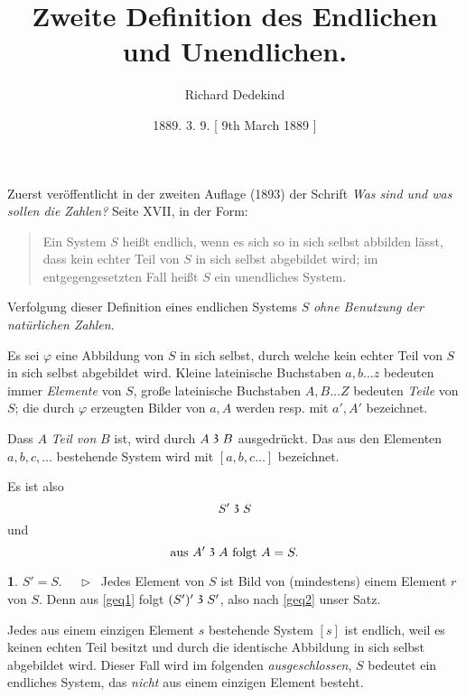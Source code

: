 \documentclass[leqno,hidelinks]{article}
\theoremstyle{definition}
\newtheorem{satz}{\protect\satzname}
\newcommand{\satzname}{}
\renewcommand{\satzname}{\hspace{-4pt}.\ Satz}%
\renewcommand{\satzname}{\hspace{-4pt}.\ Theorem}%
\newcommand\Beweis{\medskip \newline $ \phantom{'.'} \rhd \ $}%
\newcommand\TeilVon{\mathrel{\raisebox{0.45ex}{$\mathfrak{3}$}}}
\begin{document}
\hypersetup{pageanchor=false}

\title{Zweite Definition des Endlichen und Unendlichen.}
\author{Richard Dedekind}
\date{1889. 3. 9. \phantom{} [ 9th March 1889 ]}
\maketitle

\thispagestyle{empty}

\begin{paracol}{2} %


\noindent Zuerst veröffentlicht in der zweiten Auflage (1893) der Schrift
\textit{\glqq Was sind und was sollen die Zahlen?\grqq{}} Seite XVII, in der Form:%

\begin{quote}
Ein System $S$ heißt endlich, wenn es sich so in sich selbst abbilden
lässt, dass kein echter Teil von $S$ in sich selbst abgebildet
wird; im entgegengesetzten Fall heißt $S$ ein unendliches System.
\end{quote}

Verfolgung dieser Definition eines endlichen Systems $S$
\emph{ohne Benutzung der natürlichen Zahlen}.

Es sei $\varphi$ eine Abbildung von $S$ in sich selbst, durch welche kein echter
Teil von $S$ in sich selbst abgebildet wird.
Kleine lateinische Buchstaben  $a, b \ldots z$ bedeuten immer \emph{Elemente} von
$S$, große lateinische Buchstaben $A, B \ldots Z$ bedeuten \emph{Teile} von $S$;
die durch $\varphi$ erzeugten Bilder von $a, A$ werden resp. mit $a', A'$ bezeichnet.

Dass $A$ \emph{Teil von} $B$ ist, wird durch $A \TeilVon B$ ausgedrückt. Das aus den
Elementen $a, b, c, \ldots $ bestehende System wird mit $[a, b, c \ldots]$ bezeichnet.

Es ist also
\begin{equation}\label{geq1}
				S' \TeilVon S
\end{equation}
und%
\begin{equation}\label{geq2}
		\text{aus } A' \TeilVon A \text{ folgt } A = S.
\end{equation}

\begin{satz}\label{gthm1}$S' = S$.
\Beweis
Jedes Element von $S$ ist Bild von (mindestens) einem Element $r$ von $S$. Denn
aus \eqref{geq1} folgt $(S')' \TeilVon S'$, also nach \eqref{geq2} unser Satz.
\end{satz}
Jedes aus einem einzigen Element $s$ bestehende System $[s]$ ist endlich, weil
es keinen echten Teil besitzt und durch die identische Abbildung in sich selbst
abgebildet wird. Dieser Fall wird im folgenden \emph{ausgeschlossen}, $S$ bedeutet
ein endliches System, das \emph{nicht} aus einem einzigen Element besteht.


\end{paracol}
\end{document}
